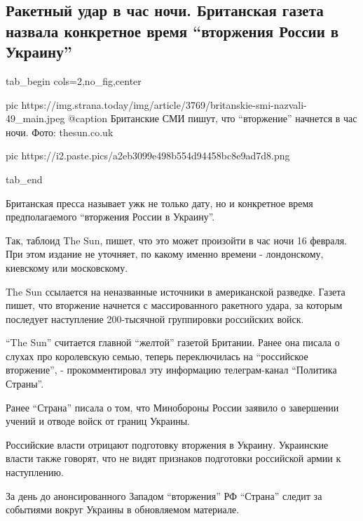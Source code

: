  
 
 
 
 
 
\subsection{Ракетный удар в час ночи. Британская газета назвала конкретное время \enquote{вторжения России в Украину}}
\label{sec:15_02_2022.stz.news.ua.strana.3.raketnyj_udar_v_chas_nochi}
 


\ifcmt
  tab_begin cols=2,no_fig,center

     pic https://img.strana.today/img/article/3769/britanskie-smi-nazvali-49_main.jpeg
		 @caption Британские СМИ пишут, что \enquote{вторжение} начнется в час ночи. Фото: thesun.co.uk 

		 pic https://i2.paste.pics/a2eb3099e498b554d94458bc8e9ad7d8.png

  tab_end
\fi

Британская пресса называет ужк не только дату, но и конкретное время
предполагаемого \enquote{вторжения России в Украину}.

Так, таблоид The Sun, пишет, что это может произойти в час ночи 16 февраля. При
этом издание не уточняет, по какому именно времени - лондонскому, киевскому или
московскому.

The Sun ссылается на неназванные источники в американской разведке. Газета
пишет, что вторжение начнется с массированного ракетного удара, за которым
последует наступление 200-тысячной группировки российских войск.

\enquote{The Sun} считается главной \enquote{желтой} газетой Британии. Ранее она писала
о слухах про королевскую семью, теперь переключилась на \enquote{российское
вторжение}, - прокомментировал эту информацию телеграм-канал \enquote{Политика
Страны}.

Ранее \enquote{Страна} писала о том, что Минобороны России заявило о завершении учений
и отводе войск от границ Украины.

Российские власти отрицают подготовку вторжения в Украину. Украинские власти
также говорят, что не видят признаков подготовки российской армии к
наступлению.

За день до анонсированного Западом \enquote{вторжения} РФ \enquote{Страна} следит за событиями
вокруг Украины в обновляемом материале.
